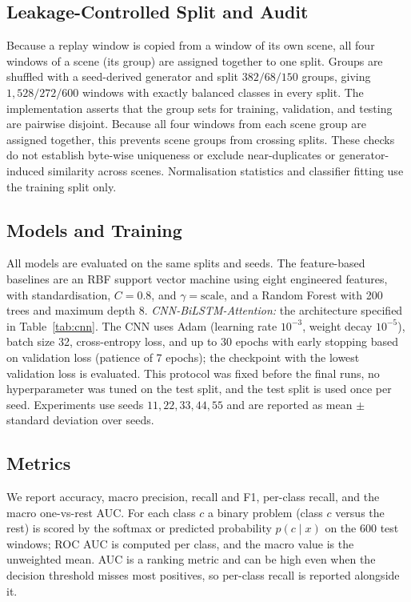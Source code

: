 \documentclass[conference]{IEEEtran}
\begin{document}
\subsection{Leakage-Controlled Split and Audit}
Because a replay window is copied from a window of its own scene, all four windows of a scene (its group) are assigned together to one split. Groups are shuffled with a seed-derived generator and split $382/68/150$ groups, giving $1{,}528/272/600$ windows with exactly balanced classes in every split. The implementation asserts that the group sets for training, validation, and testing are pairwise disjoint. Because all four windows from each scene group are assigned together, this prevents scene groups from crossing splits. These checks do not establish byte-wise uniqueness or exclude near-duplicates or generator-induced similarity across scenes. Normalisation statistics and classifier fitting use the training split only.

\subsection{Models and Training}
All models are evaluated on the same splits and seeds. The feature-based baselines are an RBF support vector machine using eight engineered features, with standardisation, $C=0.8$, and $\gamma=\text{scale}$, and a Random Forest with 200 trees and maximum depth 8. \emph{CNN-BiLSTM-Attention:} the architecture specified in Table~\ref{tab:cnn}. The CNN uses Adam (learning rate $10^{-3}$, weight decay $10^{-5}$), batch size 32, cross-entropy loss, and up to 30 epochs with early stopping based on validation loss (patience of 7 epochs); the checkpoint with the lowest validation loss is evaluated. This protocol was fixed before the final runs, no hyperparameter was tuned on the test split, and the test split is used once per seed. Experiments use seeds $11,22,33,44,55$ and are reported as mean $\pm$ standard deviation over seeds.

\subsection{Metrics}
We report accuracy, macro precision, recall and F1, per-class recall, and the macro one-vs-rest AUC. For each class $c$ a binary problem (class $c$ versus the rest) is scored by the softmax or predicted probability $p(c\mid x)$ on the 600 test windows; ROC AUC is computed per class, and the macro value is the unweighted mean. AUC is a ranking metric and can be high even when the decision threshold misses most positives, so per-class recall is reported alongside it.
\end{document}
